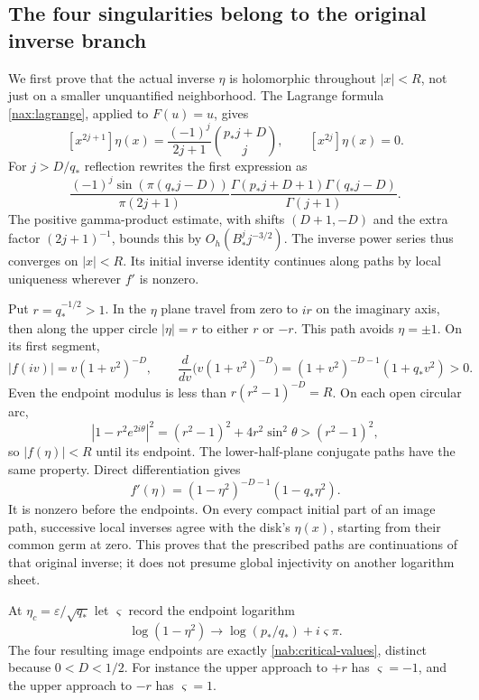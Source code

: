 \subsection{The four singularities belong to the original inverse branch}

We first prove that the actual inverse $\eta$ is holomorphic throughout
$|x|<R$, not just on a smaller unquantified neighborhood. The Lagrange
formula \eqref{nax:lagrange}, applied to $F(u)=u$, gives
\[
 [x^{2j+1}]\eta(x)=\frac{(-1)^j}{2j+1}
                      {p_*j+D\choose j},\qquad
 [x^{2j}]\eta(x)=0.
\]
For $j>D/q_*$ reflection rewrites the first expression as
\[
 \frac{(-1)^j\sin(\pi(q_*j-D))}{\pi(2j+1)}
 \frac{\Gamma(p_*j+D+1)\Gamma(q_*j-D)}{\Gamma(j+1)}.
\]
The positive gamma-product estimate, with shifts $(D+1,-D)$ and
the extra factor $(2j+1)^{-1}$, bounds this by
$O_h(B_*^j j^{-3/2})$. The inverse power series thus converges on
$|x|<R$. Its initial inverse identity continues along paths by local
uniqueness wherever $f'$ is nonzero.

Put $r=q_*^{-1/2}>1$. In the $\eta$ plane travel from zero to $ir$
on the imaginary axis, then along the upper circle $|\eta|=r$ to
either $r$ or $-r$. This path avoids $\eta=\pm1$. On its first segment,
\[
 |f(iv)|=v(1+v^2)^{-D},\qquad
 \frac{d}{dv}\bigl(v(1+v^2)^{-D}\bigr)
       =(1+v^2)^{-D-1}(1+q_*v^2)>0.
\]
Even the endpoint modulus is less than $r(r^2-1)^{-D}=R$.
On each open circular arc,
\[
 |1-r^2e^{2i\theta}|^2=(r^2-1)^2+4r^2\sin^2\theta
       >(r^2-1)^2,
\]
so $|f(\eta)|<R$ until its endpoint. The lower-half-plane conjugate
paths have the same property. Direct differentiation gives
\begin{equation}\label{nab:fprime}
 f'(\eta)=(1-\eta^2)^{-D-1}(1-q_*\eta^2).
\end{equation}
It is nonzero before the endpoints. On every compact initial part
of an image path, successive local inverses agree with the disk's
$\eta(x)$, starting from their common germ at zero. This proves
that the prescribed paths are continuations of that original inverse;
it does not presume global injectivity on another logarithm sheet.

At $\eta_c=\varepsilon/\sqrt{q_*}$ let $\varsigma$ record the
endpoint logarithm
\[
 \log(1-\eta^2)\longrightarrow
                   \log(p_*/q_*)+i\varsigma\pi.
\]
The four resulting image endpoints are exactly
\eqref{nab:critical-values}, distinct because $0<D<1/2$.
For instance the upper approach to $+r$ has $\varsigma=-1$,
and the upper approach to $-r$ has $\varsigma=1$.

